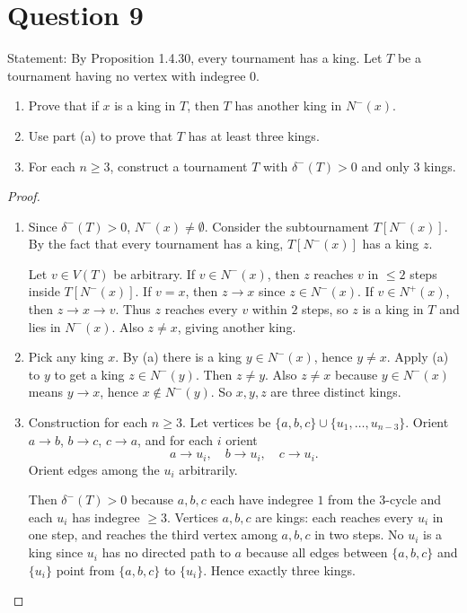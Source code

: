 \documentclass[11pt]{article}
\begin{document}
\newpage
\section*{Question 9}
\noindent Statement: By Proposition 1.4.30, every tournament has a king. Let $T$ be a tournament having no vertex with indegree $0$.
\begin{enumerate}[label=(\alph*)]
\item Prove that if $x$ is a king in $T$, then $T$ has another king in $N^-(x)$.
\item Use part (a) to prove that $T$ has at least three kings.
\item For each $n\ge 3$, construct a tournament $T$ with $\delta^-(T)>0$ and only $3$ kings.
\end{enumerate}

\medskip
\begin{proof}
~
\begin{enumerate}[label=\alph*]
    \item Since $\delta^-(T)>0$, $N^-(x)\neq\emptyset$. Consider the subtournament $T[N^-(x)]$.
By the fact that every tournament has a king, $T[N^-(x)]$ has a king $z$.

Let $v\in V(T)$ be arbitrary.
If $v\in N^-(x)$, then $z$ reaches $v$ in $\le 2$ steps inside $T[N^-(x)]$.
If $v=x$, then $z\to x$ since $z\in N^-(x)$.
If $v\in N^+(x)$, then $z\to x\to v$.
Thus $z$ reaches every $v$ within $2$ steps, so $z$ is a king in $T$ and lies in $N^-(x)$.
Also $z\neq x$, giving another king.
\item Pick any king $x$. By (a) there is a king $y\in N^-(x)$, hence $y\neq x$.
Apply (a) to $y$ to get a king $z\in N^-(y)$. Then $z\neq y$.
Also $z\neq x$ because $y\in N^-(x)$ means $y\to x$, hence $x\notin N^-(y)$.
So $x,y,z$ are three distinct kings.

\item Construction for each $n\ge 3$.
Let vertices be $\{a,b,c\}\cup\{u_1,\dots,u_{n-3}\}$.
Orient $a\to b$, $b\to c$, $c\to a$, and for each $i$ orient
\[
a\to u_i,\quad b\to u_i,\quad c\to u_i.
\]
Orient edges among the $u_i$ arbitrarily.

Then $\delta^-(T)>0$ because $a,b,c$ each have indegree $1$ from the $3$-cycle and each $u_i$ has indegree $\ge 3$.
Vertices $a,b,c$ are kings: each reaches every $u_i$ in one step, and reaches the third vertex among $a,b,c$ in two steps.
No $u_i$ is a king since $u_i$ has no directed path to $a$ because all edges between
$\{a,b,c\}$ and $\{u_i\}$ point from $\{a,b,c\}$ to $\{u_i\}$.
Hence exactly three kings.
\end{enumerate}
\end{proof}
\end{document}
